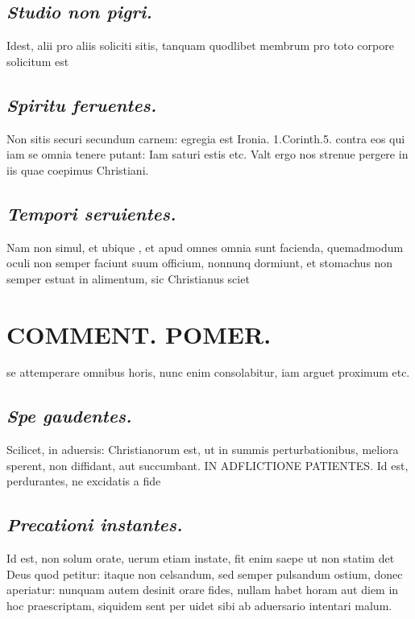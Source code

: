 \documentclass{article}
\begin{document}
\begin{pages}
\subsection*{\textit{Studio non pigri. }}\pstart Idest, alii pro aliis soliciti sitis, tanquam quodlibet membrum pro toto corpore solicitum est\pend
{}
{}
\subsection*{\textit{Spiritu feruentes. }}\pstart Non sitis securi secundum carnem: egregia est Ironia. 1.Corinth.5. contra eos qui iam se omnia tenere putant: Iam saturi estis etc. Valt ergo nos strenue pergere in iis quae coepimus Christiani.  \pend
{}
{}
\subsection*{\textit{Tempori seruientes. }}\pstart Nam non simul, et ubique , et apud omnes omnia sunt facienda, quemadmodum oculi non semper faciunt suum officium, nonnunq dormiunt, et stomachus non semper estuat in alimentum, sic Christianus sciet  \pend
\section*{COMMENT. POMER.  }\pstart se attemperare omnibus horis, nunc enim consolabitur, iam arguet proximum etc.   \pend
{}
{}
\subsection*{\textit{Spe gaudentes. }}\pstart Scilicet, in aduersis: Christianorum est, ut in summis perturbationibus, meliora sperent, non diffidant, aut succumbant. IN ADFLICTIONE PATIENTES. Id est, perdurantes, ne excidatis a fide\pend
{}
{}
\subsection*{\textit{Precationi instantes. }}\pstart Id est, non solum orate, uerum etiam instate, fit enim saepe ut non statim det Deus quod petitur: itaque non celsandum, sed semper pulsandum ostium, donec aperiatur: nunquam autem desinit orare fides, nullam habet horam aut diem in hoc praescriptam, siquidem sent per uidet sibi ab aduersario intentari malum.   \pend
{}
{}

\end{pages}
\end{document}
